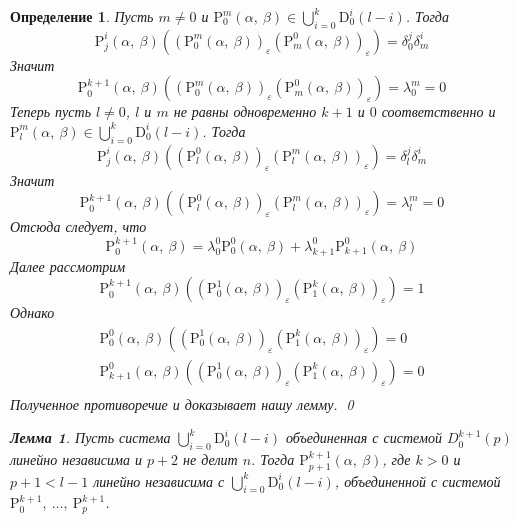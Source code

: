 \documentclass[12pt, reqno, a4paper, oneside, notitlepage]{amsart}
\makeatletter
\theoremstyle{mytheoremstyle}
\newtheorem{lemma}[theorem]{Лемма}
\theoremstyle{myremarkstyle}
\newtheorem{definition}[theorem]{Определение}
\numberwithin{equation}{section}
\renewenvironment{proof}[1][\proofname]{\par\indent {\bfseries #1\@addpunct{.} }}{\qed}
\makeatother
\begin{document}
\begin{definition}
\begin{proof}
  Пусть $m \neq 0$ и $\mathrm{P}^{m}_0(\alpha,\ \beta) \in \bigcup\limits_{i=0}^k\mathrm{D}^i_0(l-i)$.
  Тогда \[
	\mathrm{P}^{i}_j(\alpha,\ \beta)\left(\left(\mathrm{P}^m_0(\alpha,\ \beta)\right)_\varepsilon\left(\mathrm{P}^0_m(\alpha,\ \beta)\right)_\varepsilon\right)  = 
	\delta^j_0\delta^i_m
  \]
  Значит  \[
	\mathrm{P}^{k+1}_0(\alpha,\ \beta)\left(\left(\mathrm{P}^m_0(\alpha,\ \beta)\right)_\varepsilon\left(\mathrm{P}^0_m(\alpha,\ \beta)\right)_\varepsilon\right) = \lambda^m_0 = 0
  \]
  Теперь пусть $l \neq 0$, $l$ и $m$ не равны одновременно $k+1$ и $0$ соответственно и $\mathrm{P}^{m}_l(\alpha,\ \beta) \in \bigcup\limits_{i=0}^k\mathrm{D}^i_0(l-i)$.
  Тогда \[
	\mathrm{P}^{i}_j(\alpha,\ \beta)\left(\left(\mathrm{P}^0_l(\alpha,\ \beta)\right)_\varepsilon\left(\mathrm{P}^m_l(\alpha,\ \beta)\right)_\varepsilon\right)  = \delta^j_l\delta^i_m
  \]
  Значит  \[
	\mathrm{P}^{k+1}_0(\alpha,\ \beta)\left(\left(\mathrm{P}^0_l(\alpha,\ \beta)\right)_\varepsilon\left(\mathrm{P}^m_l(\alpha,\ \beta)\right)_\varepsilon\right) = \lambda^m_l = 0
  \]
  Отсюда следует, что 
  \[
	\mathrm{P}^{k+1}_0(\alpha,\ \beta) = \lambda^0_0\mathrm{P}^0_0(\alpha,\ \beta) + \lambda^0_{k+1}\mathrm{P}^0_{k+1}(\alpha,\ \beta)
  \]
  Далее рассмотрим 
  \[
	\mathrm{P}^{k+1}_0(\alpha,\ \beta)\left(\left(\mathrm{P}^1_0(\alpha,\ \beta)\right)_\varepsilon\left(\mathrm{P}^k_1(\alpha,\ \beta)\right)_\varepsilon\right) = 1
  \]
  Однако 
  \begin{eqnarray*}
	\mathrm{P}^0_0(\alpha,\ \beta)\left(\left(\mathrm{P}^1_0(\alpha,\ \beta)\right)_\varepsilon\left(\mathrm{P}^k_1(\alpha,\ \beta)\right)_\varepsilon\right) = 0\\
	\mathrm{P}^0_{k+1}(\alpha,\ \beta)\left(\left(\mathrm{P}^1_0(\alpha,\ \beta)\right)_\varepsilon\left(\mathrm{P}^k_1(\alpha,\ \beta)\right)_\varepsilon\right) = 0\\
  \end{eqnarray*}
  Полученное противоречие и доказывает нашу лемму.
\end{proof}

\begin{lemma} \label{support2}
  Пусть система $\bigcup\limits_{i=0}^k\mathrm{D}^i_0(l-i)$ 
  объединенная с системой $D^{k+1}_0(p)$ линейно независима и $p+2$ не делит $n$. 
  Тогда $\mathrm{P}^{k+1}_{p+1}(\alpha,\ \beta)$, 
  где $k>0$ и $p+1< l-1$ линейно независима с $\bigcup\limits_{i=0}^k\mathrm{D}^i_0(l-i)$, 
  объединенной с системой $\mathrm{P}^{k+1}_0,\ \dots,\ \mathrm{P}^{k+1}_p$.
\end{lemma}


\end{definition}
\end{document}
